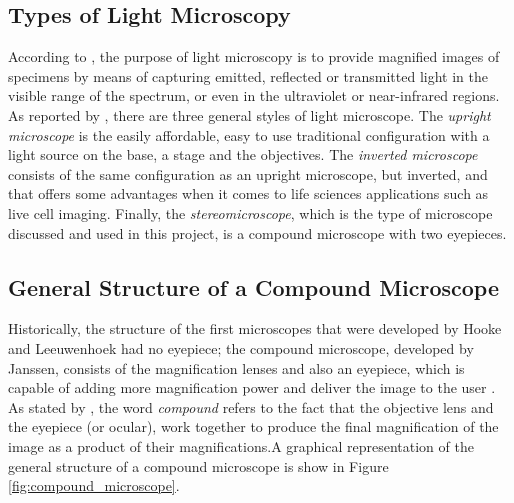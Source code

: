 \subsection{Types of Light Microscopy}

According to , the purpose of light microscopy is to provide magnified images of specimens by means of capturing emitted, reflected or transmitted light in the visible range of the spectrum, or even in the ultraviolet or near-infrared regions. As reported by , there are three general styles of light microscope. The \emph{upright microscope} is the easily affordable, easy to use traditional configuration with a light source on the base, a stage and the objectives. The \emph{inverted microscope} consists of the same configuration as an upright microscope, but inverted, and that offers some advantages when it comes to life sciences applications such as live cell imaging. Finally, the \emph{stereomicroscope}, which is the type of microscope discussed and used in this project, is a compound microscope with two eyepieces.

\subsection{General Structure of a Compound Microscope}

Historically, the structure of the first microscopes that were developed by Hooke and Leeuwenhoek had no eyepiece; the compound microscope, developed by Janssen, consists of the magnification lenses and also an eyepiece, which is capable of adding more magnification power and deliver the image to the user \cite{lawlor2019introduction}. As stated by , the word \emph{compound} refers to the fact that the objective lens and the eyepiece (or ocular), work together to produce the final magnification of the image as a product of their magnifications.A graphical representation of the general structure of a compound microscope is show in Figure \ref{fig:compound_microscope}.

